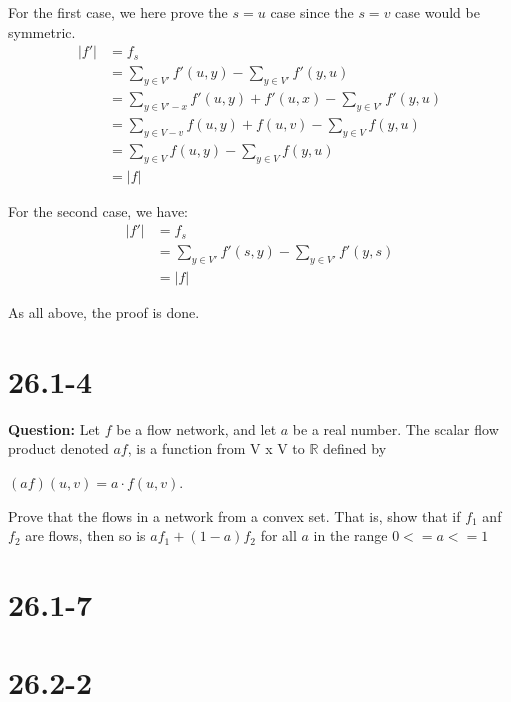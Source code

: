\documentclass[12pt]{article}
\begin{document}
For the first case, we here prove the $s=u$ case since the $s=v$ case would be symmetric.
\begin{equation}
\begin{aligned}
 |f'| &= f_s\\
 &= \sum_{y \in V'} f'(u,y) - \sum_{y \in V'} f'(y,u) \\
 &= \sum_{y \in V'-{x}} f'(u,y) + f'(u,x) - \sum_{y \in V'} f'(y,u)\\
 &= \sum_{y \in V-{v}} f(u,y) + f(u,v) - \sum_{y \in V} f(y,u)\\
 &= \sum_{y \in V} f(u,y)  - \sum_{y \in V} f(y,u)\\
 &=|f|
\end{aligned}
 \end{equation}

For the second case, we have: 
\begin{equation}
\begin{aligned}
 |f'| &= f_s\\
 &= \sum_{y \in V'} f'(s,y) - \sum_{y \in V'} f'(y,s) \\
 &= |f|
 \end{aligned}
 \end{equation}

As all above, the proof is done.

\section{26.1-4}
\textbf{Question: } Let $f$ be a flow network, and let $a$ be a real number. The scalar flow product denoted $af$, is a function from V x V to $\mathbb{R}$ defined by 

$(af)(u, v) = a \cdot f(u, v).$

Prove that the flows in a network from a convex set. That is, show that if $f_1$ anf $f_2$ are flows, then so is $af_1+(1-a)f_2$ for all $a$ in the range $0<=a<=1$

\section{26.1-7}

\section{26.2-2}
\end{document}
